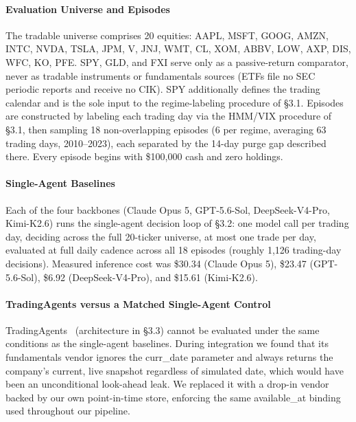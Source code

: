 \documentclass{article}
\begin{document}
\paragraph{Evaluation Universe and Episodes}

The tradable universe comprises 20 equities: AAPL, MSFT, GOOG, AMZN, INTC, NVDA, TSLA, JPM, V, JNJ, WMT, CL, XOM, ABBV, LOW, AXP, DIS, WFC, KO, PFE. SPY, GLD, and FXI serve only as a passive-return comparator, never as tradable instruments or fundamentals sources (ETFs file no SEC periodic reports and receive no CIK). SPY additionally defines the trading calendar and is the sole input to the regime-labeling procedure of \S3.1. Episodes are constructed by labeling each trading day via the HMM/VIX procedure of \S3.1, then sampling 18 non-overlapping episodes (6 per regime, averaging 63 trading days, 2010--2023), each separated by the 14-day purge gap described there. Every episode begins with \$100,000 cash and zero holdings.

\paragraph{Single-Agent Baselines}

Each of the four backbones (Claude Opus 5, GPT-5.6-Sol, DeepSeek-V4-Pro, Kimi-K2.6) runs the single-agent decision loop of \S3.2: one model call per trading day, deciding across the full 20-ticker universe, at most one trade per day, evaluated at full daily cadence across all 18 episodes (roughly 1,126 trading-day decisions). Measured inference cost was \$30.34 (Claude Opus 5), \$23.47 (GPT-5.6-Sol), \$6.92 (DeepSeek-V4-Pro), and \$15.61 (Kimi-K2.6).

\paragraph{TradingAgents versus a Matched Single-Agent Control}

TradingAgents~\cite{xiao2024ta} (architecture in \S3.3) cannot be evaluated under the same conditions as the single-agent baselines. During integration we found that its fundamentals vendor ignores the curr\_date parameter and always returns the company's current, live snapshot regardless of simulated date, which would have been an unconditional look-ahead leak. We replaced it with a drop-in vendor backed by our own point-in-time store, enforcing the same available\_at binding used throughout our pipeline.
\end{document}
